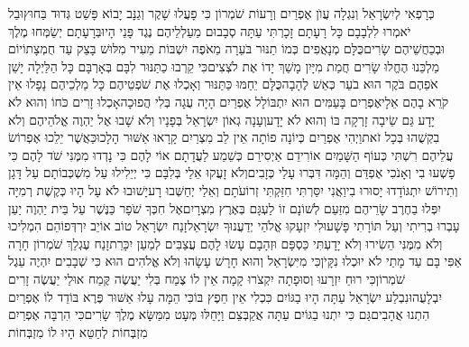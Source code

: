 \documentclass[../main/main.tex]{subfiles}
\begin{document}
\begin{multicols}{\ncols}
כְּרָפְאִי לְיִשְׂרָאֵל וְנִגְלָה עֲוֺן אֶפְרַיִם וְרָעוֹת שֹׁמְרוֹן כִּי פָעֲלוּ שָׁקֶר וְגַנָּב יָבוֹא פָּשַׁט גְּדוּד בַּחוּץ\PreVerseSpace{}וּבַל יֹאמְרוּ לִלְבָבָם כָּל רָעָתָם זָכָרְתִּי עַתָּה סְבָבוּם מַעַלְלֵיהֶם נֶגֶד פָּנַי הָיוּ\PreVerseSpace{}בְּרָעָתָם יְשַׂמְּחוּ מֶלֶךְ וּבְכַחֲשֵׁיהֶם שָׂרִים\PreVerseSpace{}כֻּלָּם מְנָאֲפִים כְּמוֹ תַנּוּר בֹּעֵרָה מֵאֹפֶה יִשְׁבּוֹת מֵעִיר מִלּוּשׁ בָּצֵק עַד חֻמְצָתוֹ\PreVerseSpace{}יוֹם מַלְכֵּנוּ הֶחֱלוּ שָׂרִים חֲמַת מִיָּיִן מָשַׁךְ יָדוֹ אֶת לֹצְצִים\PreVerseSpace{}כִּי קֵרְבוּ כַתַּנּוּר לִבָּם בְּאָרְבָּם כָּל הַלַּיְלָה יָשֵׁן אֹפֵהֶם בֹּקֶר הוּא בֹעֵר כְּאֵשׁ לֶהָבָה\PreVerseSpace{}כֻּלָּם יֵחַמּוּ כַּתַּנּוּר וְאָכְלוּ אֶת שֹׁפְטֵיהֶם כָּל מַלְכֵיהֶם נָפָלוּ אֵין קֹרֵא בָהֶם אֵלָי\PreVerseSpace{}אֶפְרַיִם בָּעַמִּים הוּא יִתְבּוֹלָל אֶפְרַיִם הָיָה עֻגָה בְּלִי הֲפוּכָה\PreVerseSpace{}אָכְלוּ זָרִים כֹּחוֹ וְהוּא לֹא יָדָע גַּם שֵׂיבָה זָרְקָה בּוֹ וְהוּא לֹא יָדָע\PreVerseSpace{}וְעָנָה גְאוֹן יִשְׂרָאֵל בְּפָנָיו וְלֹא שָׁבוּ אֶל יַהְוֶה אֱלֹהֵיהֶם וְלֹא בִקְשֻׁהוּ בְּכָל זֹאת\PreVerseSpace{}וַיְהִי אֶפְרַיִם כְּיוֹנָה פוֹתָה אֵין לֵב מִצְרַיִם קָרָאוּ אַשּׁוּר הָלָכוּ\PreVerseSpace{}כַּאֲשֶׁר יֵלֵכוּ אֶפְרוֹשׂ עֲלֵיהֶם רִשְׁתִּי כְּעוֹף הַשָּׁמַיִם אוֹרִידֵם אַיְסִירֵם כְּשֵׁמַע לַעֲדָתָם \ClosedSection{}אוֹי לָהֶם כִּי נָדְדוּ מִמֶּנִּי שֹׁד לָהֶם כִּי פָשְׁעוּ בִי וְאָנֹכִי אֶפְדֵּם וְהֵמָּה דִּבְּרוּ עָלַי כְּזָבִים\PreVerseSpace{}וְלֹא זָעֲקוּ אֵלַי בְּלִבָּם כִּי יְיֵלִילוּ עַל מִשְׁכְּבוֹתָם עַל דָּגָן וְתִירוֹשׁ יִתְגּוֹדָדוּ\SubEnd{} יָסוּרוּ בִי\PreVerseSpace{}וַאֲנִי יִסַּרְתִּי חִזַּקְתִּי זְרוֹעֹתָם וְאֵלַי יְחַשְּׁבוּ רָע\PreVerseSpace{}יָשׁוּבוּ לֹא עָל הָיוּ כְּקֶשֶׁת רְמִיָּה יִפְּלוּ בַחֶרֶב שָׂרֵיהֶם מִזַּעַם לְשׁוֹנָם זוֹ לַעְגָּם בְּאֶרֶץ מִצְרָיִם\PreChapterSpace{}אֶל חִכְּךָ שֹׁפָר כַּנֶּשֶׁר עַל בֵּית יַהְוֶה יַעַן עָבְרוּ בְרִיתִי וְעַל תּוֹרָתִי פָּשָׁעוּ\PreVerseSpace{}לִי יִזְעָקוּ אֱלֹהַי יְדַעֲנוּךָ יִשְׂרָאֵל\PreVerseSpace{}זָנַח יִשְׂרָאֵל טוֹב אוֹיֵב יִרְדְּפוֹ\PreVerseSpace{}הֵם הִמְלִיכוּ וְלֹא מִמֶּנִּי הֵשִׂירוּ וְלֹא יָדָעְתִּי כַּסְפָּם וּזְהָבָם עָשׂוּ לָהֶם עֲצַבִּים לְמַעַן יִכָּרֵת\PreVerseSpace{}זָנַח עֶגְלֵךְ שֹׁמְרוֹן חָרָה אַפִּי בָּם עַד מָתַי לֹא יוּכְלוּ נִקָּיֹן\PreVerseSpace{}כִּי מִיִּשְׂרָאֵל וְהוּא חָרָשׁ עָשָׂהוּ וְלֹא אֱלֹהִים הוּא כִּי שְׁבָבִים יִהְיֶה עֵגֶל שֹׁמְרוֹן\PreVerseSpace{}כִּי רוּחַ יִזְרָעוּ וְסוּפָתָה יִקְצֹרוּ קָמָה אֵין לוֹ צֶמַח בְּלִי יַעֲשֶׂה קֶּמַח אוּלַי יַעֲשֶׂה זָרִים יִבְלָעֻהוּ\PreVerseSpace{}נִבְלַע יִשְׂרָאֵל עַתָּה הָיוּ בַגּוֹיִם כִּכְלִי אֵין חֵפֶץ בּוֹ\PreVerseSpace{}כִּי הֵמָּה עָלוּ אַשּׁוּר פֶּרֶא בּוֹדֵד לוֹ אֶפְרַיִם הִתְנוּ אֲהָבִים\PreVerseSpace{}גַּם כִּי יִתְנוּ בַגּוֹיִם עַתָּה אֲקַבְּצֵם וַיָּחֵלּוּ מְּעָט מִמַּשָּׂא מֶלֶךְ שָׂרִים\PreVerseSpace{}כִּי הִרְבָּה אֶפְרַיִם מִזְבְּחוֹת לְחַטֵּא\SubEnd{} הָיוּ לוֹ מִזְבְּחוֹת 
\end{multicols}
\end{document}
